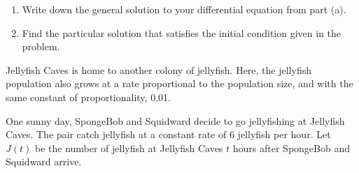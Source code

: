 \documentclass{article}
\begin{document}
\begin{enumerate}
\begin{problem}
\begin{enumerate}
        \item
        \begin{problem}
        Write down the general solution to your differential equation from part (a).
        \end{problem}

        \item 
        \begin{problem}
        Find the particular solution that satisfies the initial condition given in the problem.
        \end{problem}


\pspace{\newpage}
\end{enumerate}

        Jellyfish Caves is home to another colony of jellyfish. Here, the jellyfish population also grows at a rate proportional to the population size, and with the same constant of proportionality, 0.01.
        
        One sunny day, SpongeBob and Squidward decide to go jellyfishing at Jellyfish Caves. The pair catch jellyfish at a constant rate of $6$ jellyfish per hour. Let $J(t)$ be the number of jellyfish at Jellyfish Caves $t$ hours after SpongeBob and Squidward arrive.
        

\end{problem}
\end{enumerate}
\end{document}
